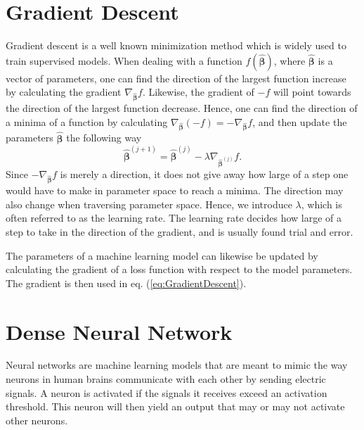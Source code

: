 \section{Gradient Descent}
\label{sec:SupLearGradDesc}

Gradient descent is a well known minimization method which is widely used to train supervised models. When dealing with a function $f(\hat{\boldsymbol{\beta}})$, where $\hat{\boldsymbol{\beta}}$ is a vector of parameters, one can find the direction of the largest function increase by calculating the gradient $\nabla_{\hat{\boldsymbol{\beta}}}f$. Likewise, the gradient of $-f$ will point towards the direction of the largest function decrease. Hence, one can find the direction of a minima of a function by calculating $\nabla_{\hat{\boldsymbol{\beta}}}(-f) = -\nabla_{\hat{\boldsymbol{\beta}}}f$, and then update the parameters $\hat{\boldsymbol{\beta}}$ the following way
\begin{equation}
    \label{eq:GradientDescent}
    \hat{\boldsymbol{\beta}}^{(j+1)} =  \hat{\boldsymbol{\beta}}^{(j)} - \lambda \nabla_{\hat{\boldsymbol{\beta}}^{(j)}}f.
\end{equation}
Since $-\nabla_{\hat{\boldsymbol{\beta}}}f$ is merely a direction, it does not give away how large of a step one would have to make in parameter space to reach a minima. The direction may also change when traversing parameter space. Hence, we introduce $\lambda$, which is often referred to as the learning rate. The learning rate decides how large of a step to take in the direction of the gradient, and is usually found trial and error. 

The parameters of a machine learning model can likewise be updated by calculating the gradient of a loss function with respect to the model parameters. The gradient is then used in eq. (\ref{eq:GradientDescent}).

\section{Dense Neural Network}
\label{sec:SupLearDNN}

Neural networks are machine learning models that are meant to mimic the way neurons in human brains communicate with each other by sending electric signals. A neuron is activated if the signals it receives exceed an activation threshold. This neuron will then yield an output that may or may not activate other neurons.

